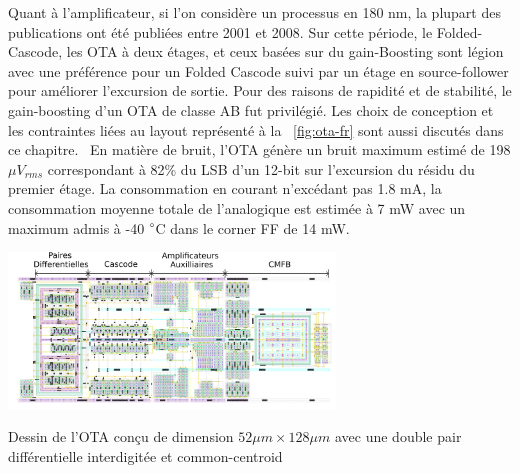 \begin{mdframed}[linecolor=Prune,linewidth=1]
Quant à l'amplificateur, si l'on considère un processus en 180 nm, la plupart des publications ont été publiées entre 2001 et 2008. Sur cette période, le Folded-Cascode, les OTA à deux étages, et ceux basées sur du gain-Boosting sont légion avec une préférence pour un Folded Cascode suivi par un étage en source-follower pour améliorer l'excursion de sortie. Pour des raisons de rapidité et de stabilité, le gain-boosting d'un OTA de classe AB fut privilégié. Les choix de conception et les contraintes liées au layout représenté à la \figurename~\ref{fig:ota-fr} sont aussi discutés dans ce chapitre.  En matière de bruit, l'OTA génère un bruit maximum estimé de 198 \(\mu V _{rms} \) correspondant à 82\% du LSB d'un 12-bit sur l'excursion du résidu du premier étage. La consommation en courant n'excédant pas 1.8 mA, la consommation moyenne totale de l'analogique est estimée à 7 mW avec un maximum admis à -40 $\degree$C dans le corner FF de 14 mW.

\begin{center}
    \centering
    \includegraphics[width=0.65\textwidth]{Chapter7/Figs/layout_ota_v2-fr.png}
    \caption[]{Dessin de l'OTA conçu de dimension \(52 \mu m \times 128 \mu m\) avec une double pair différentielle interdigitée et common-centroid}
    \label{fig:ota-fr}
\end{center}


\end{mdframed}
